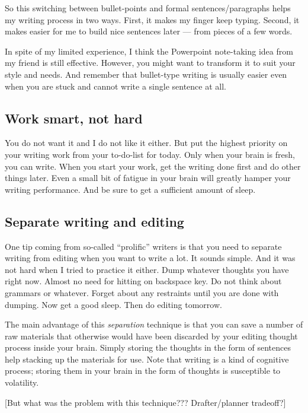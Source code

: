 \documentclass[11pt]{article}
\begin{document}
So this switching between bullet-points and formal sentences/paragraphs helps
my writing process in two ways. First, it makes my finger keep typing. Second,
it makes easier for me to build nice sentences later --- from pieces of a
few words.

In spite of my limited experience, I think the Powerpoint note-taking idea
from my friend is still effective. However, you might want to transform it to
suit your style and needs. And remember that bullet-type writing is usually
easier even when you are stuck and cannot write a single sentence at all.

\subsection{Work smart, not hard}

You do not want it and I do not like it either. But put the highest priority
on your writing work from your to-do-list for today. Only when your brain is
fresh, you can write. When you start your work, get the writing done first and
do other things later. Even a small bit of fatigue in your brain will greatly
hamper your writing performance. And be sure to get a sufficient amount of
sleep. 

\subsection{Separate writing and editing}

One tip coming from so-called ``prolific'' writers is that you need to
separate writing from editing when you want to write a lot. It sounds simple.
And it was not hard when I tried to practice it either.  Dump whatever
thoughts you have right now.  Almost no need for hitting on backspace key. Do
not think about grammars or whatever. Forget about any restraints until you
are done with dumping. Now get a good sleep. Then do editing tomorrow.

The main advantage of this \emph{separation} technique is that you can save a
number of raw materials that otherwise would have been discarded by your
editing thought process inside your brain. Simply storing the thoughts in the
form of sentences help stacking up the materials for use. Note that writing is
a kind of cognitive process; storing them in your brain in the form of
thoughts is susceptible to volatility.

[But what was the problem with this technique??? Drafter/planner tradeoff?]
\end{document}
